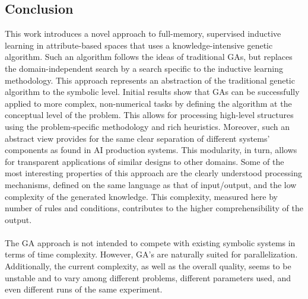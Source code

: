 \documentclass[../main.tex]{subfiles}
\begin{document}
\subsection{Conclusion}
This work introduces a novel approach to full-memory, supervised inductive learning in attribute-based spaces that uses
a knowledge-intensive genetic algorithm. Such an algorithm follows the ideas of traditional GAs, but replaces the
domain-independent search by a search specific to the inductive learning methodology. This approach represents an
abstraction of the traditional genetic algorithm to the symbolic level. Initial results show that GAs can be
successfully applied to more complex, non-numerical tasks by defining the algorithm at the conceptual level of the
problem. This allows for processing high-level structures using the problem-specific methodology and rich heuristics.
Moreover, such an abstract view provides for the same clear separation of different systems' components as found in AI
production systems. This modularity, in turn, allows for transparent applications of similar designs to other domains.
Some of the most interesting properties of this approach are the clearly understood processing mechanisms, defined on
the same language as that of input/output, and the low complexity of the generated knowledge. This complexity, measured
here by number of rules and conditions, contributes to the higher comprehensibility of the output.
\\\\
The GA approach is not intended to compete with existing symbolic systems in terms of time complexity. However, GA's
are naturally suited for parallelization. Additionally, the current complexity, as well as the overall quality, seems
to be unstable and to vary among different problems, different parameters used, and even different runs of the same
experiment.
\end{document}
